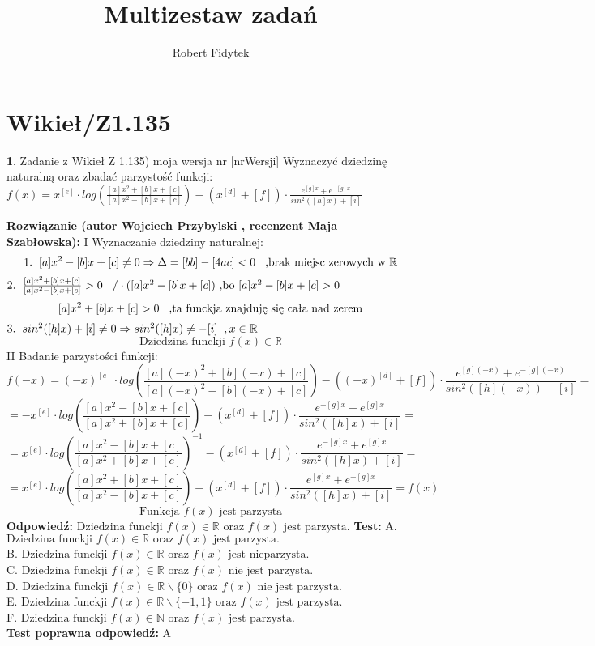 \documentclass[12pt, a4paper]{article}
\title{Multizestaw zadań}
\author{Robert Fidytek}
\date{}
\theoremstyle{definition} %
\newtheorem{zad}{}
\newcommand{\kategoria}[1]{\section{#1}} %
\newcommand{\zadStart}[1]{\begin{zad}#1\newline} %
\newcommand{\zadStop}{\end{zad}}   %
\newcommand{\rozwStart}[2]{\noindent \textbf{Rozwiązanie (autor #1 , recenzent #2): }\newline} %
\newcommand{\rozwStop}{\newline}                                            %
\newcommand{\odpStart}{\noindent \textbf{Odpowiedź:}\newline}    %
\newcommand{\odpStop}{\newline}                                             %
\newcommand{\testStart}{\noindent \textbf{Test:}\newline} %
\newcommand{\testStop}{\newline} %
\newcommand{\kluczStart}{\noindent \textbf{Test poprawna odpowiedź:}\newline} %
\newcommand{\kluczStop}{\newline} %
\begin{document}
\maketitle


\kategoria{Wikieł/Z1.135}
\zadStart{Zadanie z Wikieł Z 1.135) moja wersja nr [nrWersji]}
Wyznaczyć dziedzinę naturalną oraz zbadać parzystość funkcji:\\
$f(x)=x^{[e]}\cdot log(\frac{[a]x^{2}+[b]x+[c]}{[a]x^{2}-[b]x+[c]})-(x^{[d]}+[f])\cdot\frac{e^{[g]x}+e^{-[g]x}}{sin^{2}([h]x)+[i]}$
\zadStop
\rozwStart{Wojciech Przybylski}{Maja Szabłowska}
I Wyznaczanie dziedziny naturalnej:
$$1.\hspace{2mm} [a]x^{2}-[b]x+[c]\neq0 \Rightarrow \Delta=[bb]-[4ac]<0\hspace{3mm}\mbox{,brak miejsc zerowych w }\mathbb{R}$$
$2.\hspace{2mm}  \frac{[a]x^{2}+[b]x+[c]}{[a]x^{2}-[b]x+[c]}>0\hspace{3mm}/\cdot([a]x^{2}-[b]x+[c])\mbox{ ,bo }[a]x^{2}-[b]x+[c]>0 $
$$[a]x^{2}+[b]x+[c]>0 \hspace{3mm}\mbox{,ta funckja znajduję się cała nad zerem}$$
$3.\hspace{2mm}  sin^{2}([h]x)+[i]\neq0 \Rightarrow sin^{2}([h]x)\neq-[i]\hspace{2mm},x\in\mathbb{R} $
$$\mbox{Dziedzina funckji }f(x)\in \mathbb{R}$$
II Badanie parzystości funkcji:
$$f(-x)=(-x)^{[e]}\cdot log(\frac{[a](-x)^{2}+[b](-x)+[c]}{[a](-x)^{2}-[b](-x)+[c]})-((-x)^{[d]}+[f])\cdot\frac{e^{[g](-x)}+e^{-[g](-x)}}{sin^{2}([h](-x))+[i]}=$$
$$=-x^{[e]}\cdot log(\frac{[a]x^{2}-[b]x+[c]}{[a]x^{2}+[b]x+[c]})-(x^{[d]}+[f])\cdot\frac{e^{-[g]x}+e^{[g]x}}{sin^{2}([h]x)+[i]}=$$
$$=x^{[e]}\cdot log(\frac{[a]x^{2}-[b]x+[c]}{[a]x^{2}+[b]x+[c]})^{-1}-(x^{[d]}+[f])\cdot\frac{e^{-[g]x}+e^{[g]x}}{sin^{2}([h]x)+[i]}=$$
$$=x^{[e]}\cdot log(\frac{[a]x^{2}+[b]x+[c]}{[a]x^{2}-[b]x+[c]})-(x^{[d]}+[f])\cdot\frac{e^{[g]x}+e^{-[g]x}}{sin^{2}([h]x)+[i]}=f(x)$$
$$\mbox{Funkcja }f(x)\mbox{ jest parzysta}$$
\rozwStop
\odpStart
$\mbox{Dziedzina funckji }f(x)\in \mathbb{R} \mbox{ oraz } f(x)\mbox{ jest parzysta.}$ 
\odpStop
\testStart
A. $\mbox{Dziedzina funckji }f(x)\in \mathbb{R} \mbox{ oraz } f(x)\mbox{ jest parzysta.}$ \\
B. $\mbox{Dziedzina funckji }f(x)\in \mathbb{R} \mbox{ oraz } f(x)\mbox{ jest nieparzysta.}$ \\
C. $\mbox{Dziedzina funckji }f(x)\in \mathbb{R} \mbox{ oraz } f(x)\mbox{ nie jest parzysta.}$ \\
D. $\mbox{Dziedzina funckji }f(x)\in \mathbb{R}\backslash\{0\} \mbox{ oraz } f(x)\mbox{ nie jest parzysta.}$ \\
E. $\mbox{Dziedzina funckji }f(x)\in \mathbb{R}{\backslash}\{-1,1\} \mbox{ oraz } f(x)\mbox{ jest parzysta.}$ \\
F. $\mbox{Dziedzina funckji }f(x)\in \mathbb{N} \mbox{ oraz } f(x)\mbox{ jest parzysta.}$ \\
\testStop
\kluczStart
A
\kluczStop
\end{document}
